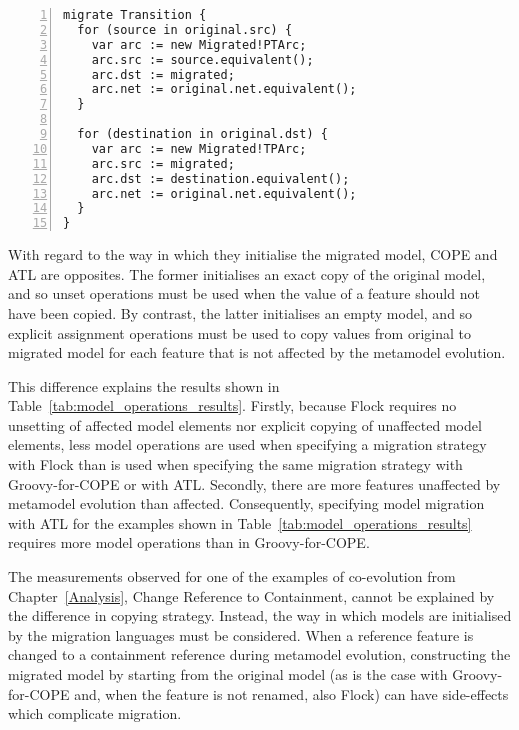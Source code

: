\begin{lstlisting}[basicstyle=\ttfamily\footnotesize, flexiblecolumns=true, numbers=left, nolol=true, caption=Petri nets model migration in Flock, label=lst:quantitive_flock, language=Flock, tabsize=2]
migrate Transition {
  for (source in original.src) {
    var arc := new Migrated!PTArc;
    arc.src := source.equivalent();
    arc.dst := migrated;
    arc.net := original.net.equivalent();
  }

  for (destination in original.dst) {
    var arc := new Migrated!TPArc;
    arc.src := migrated;
    arc.dst := destination.equivalent();
    arc.net := original.net.equivalent();
  }
}
\end{lstlisting}

With regard to the way in which they initialise the migrated model, COPE and ATL are opposites. The former initialises an exact copy of the original model, and so unset operations must be used when the value of a feature should not have been copied. By contrast, the latter initialises an empty model, and so explicit assignment operations must be used to copy values from original to migrated model for each feature that is not affected by the metamodel evolution.

This difference explains the results shown in Table~\ref{tab:model_operations_results}. Firstly, because Flock requires no unsetting of affected model elements nor explicit copying of unaffected model elements, less model operations are used when specifying a migration strategy with Flock than is used when specifying the same migration strategy with Groovy-for-COPE or with ATL. Secondly, there are more features unaffected by metamodel evolution than affected. Consequently, specifying model migration with ATL for the examples shown in Table~\ref{tab:model_operations_results} requires more model operations than in Groovy-for-COPE.


The measurements observed for one of the examples of co-evolution from Chapter~\ref{Analysis}, Change Reference to Containment, cannot be explained by the difference in copying strategy. Instead, the way in which models are initialised by the migration languages must be considered. When a reference feature is changed to a containment reference during metamodel evolution, constructing the migrated model by starting from the original model (as is the case with Groovy-for-COPE and, when the feature is not renamed, also Flock) can have side-effects which complicate migration.

